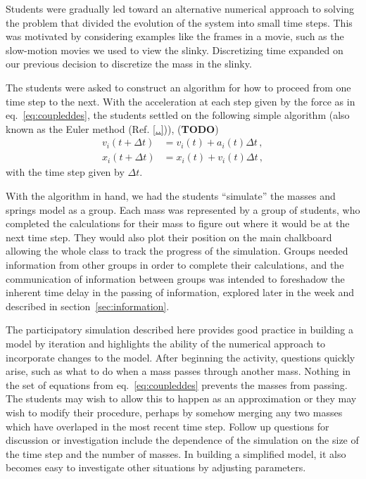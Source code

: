 \documentclass[prb,preprint,superscriptaddress]{revtex4-1}
\newcommand{\TODO}[1]{\marginpar{\raggedright\scriptsize\textbf{TODO:} #1} (\textbf{TODO})}
\newcommand{\eq}[1]{eq.~\eqref{eq:#1}}
\renewcommand{\sec}[1]{section~\ref{sec:#1}}
\newcommand{\nn}{\nonumber}
\begin{document}
Students were gradually led toward an alternative numerical approach to solving
the problem that divided the evolution of the system into small time
steps. This was motivated by considering examples like the frames in a
movie, such as the slow-motion movies we used to view the slinky. Discretizing time expanded on our previous decision to discretize the mass
in the slinky.

The students were asked to construct an algorithm
for how to proceed from one time step to the next. With the acceleration at each
step given by the force as in \eq{coupleddes}, the students settled on the
following simple algorithm (also known as the Euler method (Ref. \ref{..})),
\TODO{find textbook reference for Euler method}
\begin{align} \label{eq:algorithm}
v_i(t+\Delta t) &= v_i(t) + a_i(t)\Delta t
\,,\nn\\
x_i(t+\Delta t) &= x_i(t) + v_i(t)\Delta t
\,,\end{align}
with the time step given by $\Delta t$.

With the algorithm in hand, we had the students ``simulate'' the masses and
springs model as a group. Each mass was represented by a group of 
students, who completed the calculations for their mass to figure out where it would be
at the next time step.
They would also plot their position on the main chalkboard allowing the whole class to track
the progress of the simulation.
Groups needed information from other groups in order to complete their calculations,
and the communication of information between groups was intended 
to foreshadow the inherent time delay in the passing of information, explored later in
the week and described in \sec{information}.

The participatory simulation described here provides good practice in building
a model by iteration and highlights the ability of the numerical approach to incorporate changes to the model. After beginning the activity, questions quickly arise, such
as what to do when a mass passes through another mass. Nothing in the set of equations from \eq{coupleddes} prevents
the masses from passing. The students may wish to allow this to happen as an approximation
or they may wish to modify their procedure, perhaps by somehow merging any two masses which have overlaped
in the most recent time step. Follow up questions for discussion or investigation include
the dependence of the simulation on the size of the time step and the number of masses.
In building a simplified model, it also becomes easy to investigate
other situations by adjusting parameters.
\end{document}
